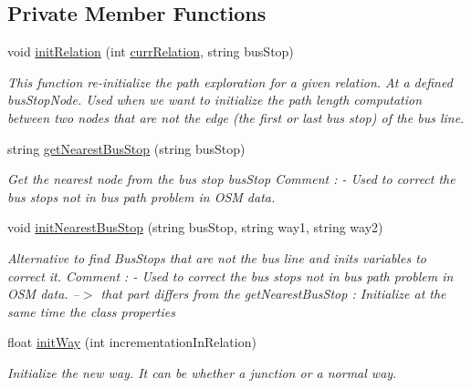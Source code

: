 \subsection*{Private Member Functions}
\begin{DoxyCompactItemize}
\item 
void \hyperlink{classCompleteDistBetweenNodes_a462e5fc7feefb4d001daab07d6163a83}{init\+Relation} (int \hyperlink{classCompleteDistBetweenNodes_a59b1019044d1b1356aed96518d966b67}{curr\+Relation}, string bus\+Stop)
\begin{DoxyCompactList}\small\item\em This function re-\/initialize the path exploration for a given relation. At a defined bus\+Stop\+Node. Used when we want to initialize the path length computation between two nodes that are not the edge (the first or last bus stop) of the bus line. \end{DoxyCompactList}\item 
string \hyperlink{classCompleteDistBetweenNodes_ad6e06a93b4bba24493c9b0b6c7abf7bc}{get\+Nearest\+Bus\+Stop} (string bus\+Stop)
\begin{DoxyCompactList}\small\item\em Get the nearest node from the bus stop \textquotesingle{}bus\+Stop\textquotesingle{} Comment \+: -\/ Used to correct the bus stops not in bus path problem in O\+SM data. \end{DoxyCompactList}\item 
void \hyperlink{classCompleteDistBetweenNodes_a348b45abac3f6e740958e27829b29f8c}{init\+Nearest\+Bus\+Stop} (string bus\+Stop, string way1, string way2)
\begin{DoxyCompactList}\small\item\em Alternative to find Bus\+Stops that are not the bus line and inits variables to correct it. Comment \+: -\/ Used to correct the bus stops not in bus path problem in O\+SM data. --$>$ that part differs from the get\+Nearest\+Bus\+Stop \+: Initialize at the same time the class properties \end{DoxyCompactList}\item 
float \hyperlink{classCompleteDistBetweenNodes_a8e0ef6259e490cec706aa321cac9856c}{init\+Way} (int incrementation\+In\+Relation)
\begin{DoxyCompactList}\small\item\em Initialize the new way. It can be whether a junction or a normal way. \end{DoxyCompactList}\item 

\end{DoxyCompactItemize}
